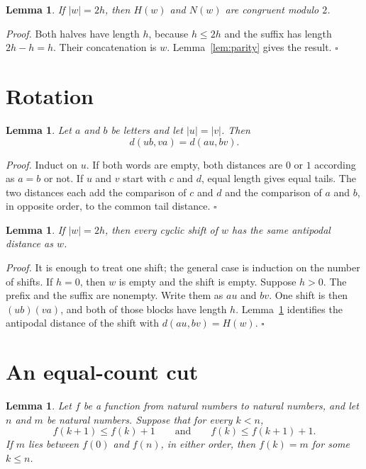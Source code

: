 \documentclass[11pt,letterpaper]{article}
\newtheorem{lemma}[theorem]{Lemma}
\newenvironment{proof}{\noindent\textit{Proof.}}{\hfill\(\square\)}
\begin{document}
\begin{lemma}
\label{lem:antipodal-parity}
If \(|w|=2h\), then \(H(w)\) and \(N(w)\) are congruent modulo \(2\).
\end{lemma}

\begin{proof}
Both halves have length \(h\), because \(h\le 2h\) and the suffix has length \(2h-h=h\). Their concatenation is \(w\). Lemma~\ref{lem:parity} gives the result.
\end{proof}

\section{Rotation}

\begin{lemma}
\label{lem:rotate-ends}
Let \(a\) and \(b\) be letters and let \(|u|=|v|\). Then
\[
d(ub,va)=d(au,bv).
\]
\end{lemma}

\begin{proof}
Induct on \(u\). If both words are empty, both distances are \(0\) or \(1\) according as \(a=b\) or not. If \(u\) and \(v\) start with \(c\) and \(d\), equal length gives equal tails. The two distances each add the comparison of \(c\) and \(d\) and the comparison of \(a\) and \(b\), in opposite order, to the common tail distance.
\end{proof}

\begin{lemma}
\label{lem:rotate}
If \(|w|=2h\), then every cyclic shift of \(w\) has the same antipodal distance as \(w\).
\end{lemma}

\begin{proof}
It is enough to treat one shift; the general case is induction on the number of shifts. If \(h=0\), then \(w\) is empty and the shift is empty. Suppose \(h>0\). The prefix and the suffix are nonempty. Write them as \(au\) and \(bv\). One shift is then \((ub)(va)\), and both of those blocks have length \(h\). Lemma~\ref{lem:rotate-ends} identifies the antipodal distance of the shift with \(d(au,bv)=H(w)\).
\end{proof}

\section{An equal-count cut}

\begin{lemma}
\label{lem:unit}
Let \(f\) be a function from natural numbers to natural numbers, and let \(n\) and \(m\) be natural numbers. Suppose that for every \(k<n\),
\[
f(k+1)\le f(k)+1\qquad\text{and}\qquad f(k)\le f(k+1)+1.
\]
If \(m\) lies between \(f(0)\) and \(f(n)\), in either order, then \(f(k)=m\) for some \(k\le n\).
\end{lemma}
\end{document}
